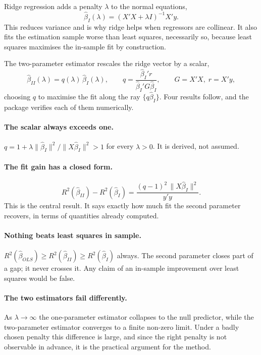 \documentclass[11pt,a4paper]{report}
\begin{document}
Ridge regression adds a penalty $\lambda$ to the normal equations,
$$\hat\beta_{I}(\lambda) = (X'X + \lambda I)^{-1} X'y .$$
This reduces variance and is why ridge helps when regressors are
collinear. It also fits the estimation sample worse than least squares,
necessarily so, because least squares maximises the in-sample fit by
construction.

The two-parameter estimator rescales the ridge vector by a scalar,
$$\hat\beta_{II}(\lambda) = q(\lambda)\,\hat\beta_{I}(\lambda),
\qquad
q = \frac{\hat\beta_I' r}{\hat\beta_I' G \hat\beta_I},
\qquad G = X'X, \; r = X'y,$$
choosing $q$ to maximise the fit along the ray $\{q\hat\beta_I\}$. Four
results follow, and the package verifies each of them numerically.

\paragraph{The scalar always exceeds one.}
$q = 1 + \lambda\|\hat\beta_I\|^2/\|X\hat\beta_I\|^2 > 1$ for every
$\lambda>0$. It is derived, not assumed.

\paragraph{The fit gain has a closed form.}
$$R^2(\hat\beta_{II}) - R^2(\hat\beta_{I})
= \frac{(q-1)^2\,\|X\hat\beta_I\|^2}{y'y}.$$
This is the central result. It says exactly how much fit the second
parameter recovers, in terms of quantities already computed.

\paragraph{Nothing beats least squares in sample.}
$R^2(\hat\beta_{OLS}) \ge R^2(\hat\beta_{II}) \ge R^2(\hat\beta_{I})$
always. The second parameter closes part of a gap; it never crosses it.
Any claim of an in-sample improvement over least squares would be false.

\paragraph{The two estimators fail differently.}
As $\lambda\to\infty$ the one-parameter estimator collapses to the null
predictor, while the two-parameter estimator converges to a finite
non-zero limit. Under a badly chosen penalty this difference is large,
and since the right penalty is not observable in advance, it is the
practical argument for the method.
\end{document}
